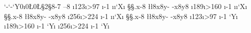 \lccode`-`-\lccode`Y0\countdef\i0\toksdef\L0\L{}\toksdef\S2\S{8-7 --8 }
\def\y{%
  \i123\def\x{\ifnum\i>97  \advance\i -1 \a\expandafter\x\fi}\x
  \i189\def\x{\ifnum\i>160 \advance\i -1 \a\expandafter\x\fi}\x
  \i256\def\x{\ifnum\i>224 \advance\i -1 \a\expandafter\x\fi}\x}
\def\a{\lccode\i\i\lccode`X\i
  \lowercase{\S\expandafter{\the\S .X-8 }\L\expandafter{\the\L 8X8Y- -X8Y8 }}}
\y\patterns{\the\S}\def\a{\lccode`Y\i\patterns{\the\L}}\y
